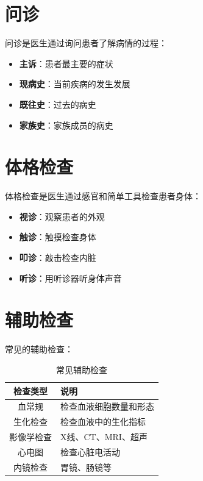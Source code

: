 \documentclass[12pt,UTF8]{ctexbook}
\begin{document}
\section{问诊}
\label{sec:history_taking}

问诊是医生通过询问患者了解病情的过程：
\begin{itemize}
    \item \textbf{主诉}：患者最主要的症状
    \item \textbf{现病史}：当前疾病的发生发展
    \item \textbf{既往史}：过去的病史
    \item \textbf{家族史}：家族成员的病史
\end{itemize}

\section{体格检查}
\label{sec:physical_examination}

体格检查是医生通过感官和简单工具检查患者身体：
\begin{itemize}
    \item \textbf{视诊}：观察患者的外观
    \item \textbf{触诊}：触摸检查身体
    \item \textbf{叩诊}：敲击检查内脏
    \item \textbf{听诊}：用听诊器听身体声音
\end{itemize}

\section{辅助检查}
\label{sec:diagnostic_tests}

常见的辅助检查：
\begin{table}[htbp]
    \centering
    \caption{常见辅助检查}
    \begin{tabular}{|c|p{8cm}|}
        \hline
        \textbf{检查类型} & \textbf{说明} \\
        \hline
        血常规 & 检查血液细胞数量和形态 \\
        \hline
        生化检查 & 检查血液中的生化指标 \\
        \hline
        影像学检查 & X线、CT、MRI、超声 \\
        \hline
        心电图 & 检查心脏电活动 \\
        \hline
        内镜检查 & 胃镜、肠镜等 \\
        \hline
    \end{tabular}
\end{table}
\end{document}
